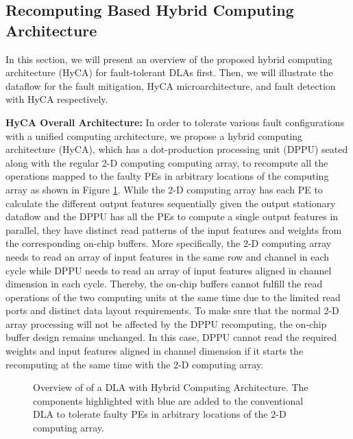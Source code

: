 \subsection{Recomputing Based Hybrid Computing Architecture}
In this section, we will present an overview of the proposed hybrid computing architecture (HyCA) for fault-tolerant DLAs first. Then, we will illustrate the dataflow for the fault mitigation, HyCA microarchitecture, and fault detection with HyCA respectively.

\textbf{HyCA Overall Architecture:}
In order to tolerate various fault configurations with a unified computing architecture, we propose a hybrid computing architecture (HyCA), which has a dot-production processing unit (DPPU) seated along with the regular 2-D computing computing array, to recompute all the operations mapped to the faulty PEs in arbitrary locations of the computing array as shown in Figure \ref{fig:mapping}. While the 2-D computing array has each PE to calculate the different output features sequentially given the output stationary dataflow \cite{Chen2016Eyeriss} and the DPPU has all the PEs to compute a single output features in parallel, they have distinct read patterns of the input features and weights from the corresponding on-chip buffers. More specifically, the 2-D computing array needs to read an array of input features in the same row and channel in each cycle while DPPU needs to read an array of input features aligned in channel dimension in each cycle. Thereby, the on-chip buffers cannot fulfill the read operations of the two computing units at the same time due to the limited read ports and distinct data layout requirements. To make sure that the normal 2-D array processing will not be affected by the DPPU recomputing, the on-chip buffer design remains unchanged. In this case, DPPU cannot read the required weights and input features aligned in channel dimension if it starts the recomputing at the same time with the 2-D computing array. 

\begin{figure}
    \setlength{\abovecaptionskip}{-2pt}
    \setlength{\belowcaptionskip}{0pt}
            \caption{Overview of of a DLA with Hybrid Computing Architecture. The components highlighted with blue are added to the conventional DLA to tolerate faulty PEs in arbitrary locations of the 2-D computing array.}
            \label{fig:mapping}
            \vspace{-1.5em}
\end{figure}

